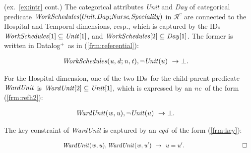 \documentclass[format=acmsmall, review=false, screen=true]{acmart}
\newcommand{\ignore}[1]{}
\newcommand{\boxtheorem}{\ensuremath{\hfill \Box}}
\newcommand{\mc}[1]{\mathcal{ #1}}
\newcommand{\nit}[1]{{\it #1}}
\newcommand{\bl}[1]{#1}
\newcommand{\nc}{{\em nc}}
\newcommand{\dplus}{{Datalog}$^+$}
\newcommand{\ideps}{IDs}
\newcommand{\egd}{{\em egd}}
\newcommand{\blue}[1]{{#1}}
\newcommand{\comlb}[1]{{\vspace{2mm}\noindent \bf \blue{COMM(LEO):}}~ #1 \hfill {\bf
    END.}\\}
\newcommand{\commos}[1]{{\vspace{2mm}\noindent \bf \blue{COMM(MOSTAFA):}}~ #1 \hfill {\bf
    END.}\\}
\begin{document}
\begin{example}\label{ex:md-relational} \bl{(ex.~\ref{ex:intr} cont.)} The categorical attributes {\it Unit} and {\it Day} of categorical predicate $\nit{WorkSchedules}(\!\nit{Unit},\!\nit{Day};\!\nit{Nurse}\!,\nit{Speciality})$ in $\mc{R}^c$ \ignore{and $\nit{Shifts}(\!\nit{Ward},\!\nit{Day};\!\nit{Nurse},\!\nit{Shift})$ in Figure~\ref{fig:omdm} are categorical relations. In \nit{WorkSchedules}, {\it Unit} and {\it Day} are categorical attributes,} are connected to the {\sf Hospital} and {\sf Temporal} dimensions, resp., which is captured by the  \ideps \ $\nit{WorkSchedules}[1]\subseteq \nit{Unit}[1]$, and $\nit{WorkSchedules}[2]\subseteq \nit{Day}[1]$. The former is written in \dplus \ as in (\ref{frm:referential}):

\vspace{-4mm}
\begin{align}
{\it WorkSchedules(u,d;n,t)},\lnot {\it Unit}(u)  ~\rightarrow&~ \bot. \label{frm:ref}
\end{align}




For the {\sf Hospital} dimension,  one of the two \ideps \ for the child-parent predicate $\nit{WardUnit}$ is $\nit{WardUnit}[2] \subseteq \nit{Unit}[1]$, which  is expressed by an \nc \ of the form (\ref{frm:refh2}):

\vspace{-4mm}
\begin{align*}
{\it WardUnit(w,u)},\lnot {\it Unit}(u)  ~\rightarrow&~ \bot.
\end{align*}
\vspace{-4mm}

\noindent The key constraint of \nit{WardUnit} is captured by an \egd \ of the form (\ref{frm:key}):

\vspace{-4mm}
\begin{align*}
\hspace*{3.3cm}{\it WardUnit(w,u)},{\it WardUnit(w,u')}  ~\rightarrow&~ \ u=u'. \hspace{3.3cm} \boxtheorem
\end{align*}

\end{example}
\end{document}
